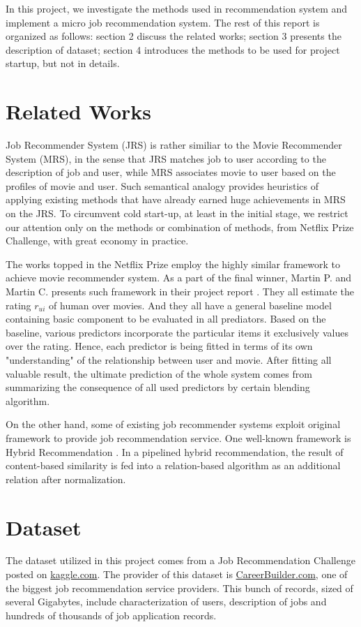 \documentclass[10pt,twocolumn,letterpaper]{article}
\begin{document}
In this project, we investigate the methods used in recommendation system and
implement a micro job recommendation system. The rest of this report is
organized as follows: section 2 discuss the related works; section 3 presents
the description of dataset; section 4 introduces the methods to be used for
project startup, but not in details.  

\section {Related Works}
Job Recommender System (JRS) is rather similiar to the Movie
Recommender System (MRS), in the sense that JRS matches job to user according
to the description of job and user, while MRS associates movie to user based on
the profiles of movie and user. Such semantical analogy provides heuristics
 of applying existing methods that have already earned huge achievements in
 MRS on the JRS. To circumvent cold start-up, at least in the initial stage,
 we restrict our attention only on the methods or combination of methods, from
 Netflix Prize Challenge, with great economy in practice. 

The works topped in the Netflix Prize employ the highly similar framework to
achieve movie recommender system. As a part of the final winner, Martin P.
and Martin C. presents such framework in their project report
\cite{Piotte09thepragmatic}. They all estimate the rating $r_{ui}$ of
human over movies. And they all have a general baseline model containing basic
component to be evaluated in all prediators. Based on the baseline, various
predictors incorporate the particular items it exclusively values over the
rating. Hence, each predictor is being fitted in terms of its own
"understanding" of the relationship between user and movie. After fitting all
valuable result, the ultimate prediction of the whole system comes from
summarizing the consequence of all used predictors by certain blending
algorithm.

On the other hand, some of existing job recommender systems exploit original
framework to provide job recommendation service. One well-known framework is
Hybrid Recommendation \cite{LuHG13}. In a pipelined hybrid
recommendation, the result of content-based similarity is fed into a
relation-based algorithm as an additional relation after normalization.

\section {Dataset}
The dataset utilized in this project comes from a Job Recommendation Challenge
posted on \url{kaggle.com}. The provider of this dataset is
\url{CareerBuilder.com}, one of the biggest job recommendation service
providers. This bunch of records, sized of several Gigabytes, include
characterization of users, description of jobs and hundreds of thousands of
job application records.
\end{document}
